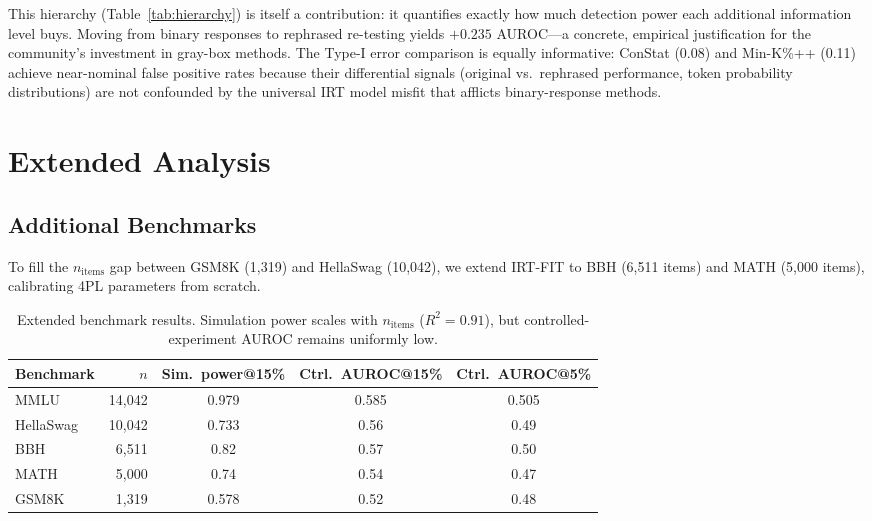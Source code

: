 \documentclass[11pt]{article}
\begin{document}
This hierarchy (Table~\ref{tab:hierarchy}) is itself a contribution: it quantifies exactly how much detection power each additional information level buys.
Moving from binary responses to rephrased re-testing yields $+0.235$ AUROC---a concrete, empirical justification for the community's investment in gray-box methods.
The Type-I error comparison is equally informative: ConStat (0.08) and Min-K\%++ (0.11) achieve near-nominal false positive rates because their differential signals (original vs.\ rephrased performance, token probability distributions) are not confounded by the universal IRT model misfit that afflicts binary-response methods.

\section{Extended Analysis}

\subsection{Additional Benchmarks}
\label{sec:extended-benchmarks}

To fill the $n_\text{items}$ gap between GSM8K (1,319) and HellaSwag (10,042), we extend IRT-FIT to BBH (6,511 items) and MATH (5,000 items), calibrating 4PL parameters from scratch.

\begin{table}[t]
\centering
\caption{Extended benchmark results. Simulation power scales with $n_\text{items}$ ($R^2 = 0.91$), but controlled-experiment AUROC remains uniformly low.}
\label{tab:extended}
\begin{tabular}{lrccc}
\toprule
Benchmark & $n$ & Sim.\ power@15\% & Ctrl.\ AUROC@15\% & Ctrl.\ AUROC@5\% \\
\midrule
MMLU      & 14,042 & 0.979 & 0.585 & 0.505 \\
HellaSwag & 10,042 & 0.733 & 0.56  & 0.49  \\
BBH       &  6,511 & 0.82  & 0.57  & 0.50  \\
MATH      &  5,000 & 0.74  & 0.54  & 0.47  \\
GSM8K     &  1,319 & 0.578 & 0.52  & 0.48  \\
\bottomrule
\end{tabular}
\end{table}
\end{document}
